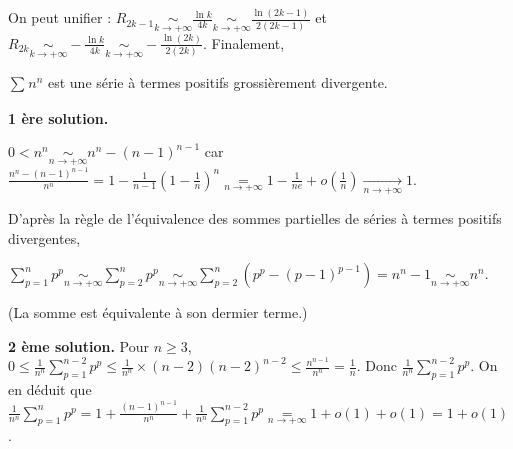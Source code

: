 {{On peut unifier : $R_{2k-1}\underset{k\rightarrow+\infty}{\sim}\frac{\ln k}{4k}\underset{k\rightarrow+\infty}{\sim}\frac{\ln(2k-1)}{2(2k-1)}$   et $R_{2k}\underset{k\rightarrow+\infty}{\sim}-\frac{\ln k}{4k}\underset{k\rightarrow+\infty}{\sim}-\frac{\ln(2k)}{2(2k)}$. Finalement,

\begin{center}
\end{center}
$\sum_{}^{}n^n$ est une série à termes positifs grossièrement divergente.

\textbf{1 ère solution.}

$0< n^n\underset{n\rightarrow+\infty}{\sim} n^n - (n-1)^{n-1}$ car $\frac{n^n - (n-1)^{n-1}}{n^n}=  1-\frac{1}{n-1}\left(1-\frac{1}{n}\right)^{n}\underset{n\rightarrow+\infty}{=}1-\frac{1}{ne}+o\left(\frac{1}{n}\right)\underset{n\rightarrow+\infty}{\rightarrow}1$.

D'après la règle de l'équivalence des sommes partielles de séries à termes positifs divergentes,

\begin{center}
$\sum_{p=1}^{n}p^p\underset{n\rightarrow+\infty}{\sim}\sum_{p=2}^{n}p^p\underset{n\rightarrow+\infty}{\sim}\sum_{p=2}^{n}(p^p-(p-1)^{p-1}) = n^n-1\underset{n\rightarrow+\infty}{\sim}n^n$.
\end{center}

(La somme est équivalente à son dermier terme.)

\textbf{2 ème solution.} Pour $n\geqslant3$, $0\leqslant\frac{1}{n^n}\sum_{p=1}^{n-2}p^p\leqslant\frac{1}{n^n}\times(n-2)(n-2)^{n-2}\leqslant \frac{n^{n-1}}{n^n}=\frac{1}{n}$. Donc $\frac{1}{n^n}\sum_{p=1}^{n-2}p^p$. On en déduit que $\frac{1}{n^n}\sum_{p=1}^{n}p^p=1+\frac{(n-1)^{n-1}}{n^n}+\frac{1}{n^n}\sum_{p=1}^{n-2}p^p\underset{n\rightarrow+\infty}{=}1+o(1)+o(1)=1+o(1)$.

\begin{center}
\end{center}
}
}
